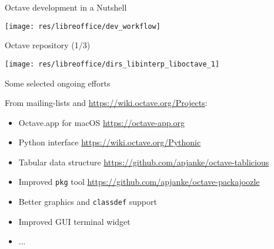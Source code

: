 \begin{frame}{Octave development in a Nutshell}
\begin{center}
\texttt{[image: res/libreoffice/dev\_workflow]}
\end{center}
\end{frame}

\begin{frame}{Octave repository (1/3)}
\begin{center}
\texttt{[image: res/libreoffice/dirs\_libinterp\_liboctave\_1]}
\end{center}
\end{frame}



\begin{frame}{Some selected ongoing efforts}

From mailing-lists
and {\color{DarkBlue}\url{https://wiki.octave.org/Projects}}:\\[1em]
\begin{itemize}
\itemsep1em
\item
Octave.app for macOS
\hfill{\scriptsize\color{DarkBlue} \url{https://octave-app.org}}
\item
Python interface
\hfill{\scriptsize\color{DarkBlue} \url{https://wiki.octave.org/Pythonic}}
\item
Tabular data structure
\hfill{\scriptsize\color{DarkBlue}
\url{https://github.com/apjanke/octave-tablicious}}
\item
Improved \texttt{pkg} tool
\hfill{\scriptsize\color{DarkBlue}
\url{https://github.com/apjanke/octave-packajoozle}}
\item
Better graphics and \texttt{classdef} support
\item
Improved GUI terminal widget
\item
...
\end{itemize}
\end{frame}